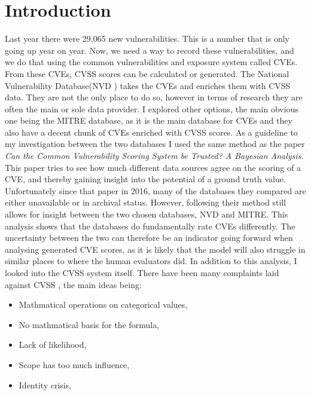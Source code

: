 \documentclass[12pt]{article}
\begin{document}
\section{Introduction}

Last year there were 29,065 new vulnerabilities. This is a number that is only going up year on
year. Now, we need a way to record these vulnerabilities, and we do that using the common
vulnerabilities and exposure system called CVEs. From these CVEs, CVSS scores can be calculated or
generated. The National Vulnerability Database(NVD \cite{NVD}) takes the CVEs and enriches them with
CVSS data. They are not the only place to do so, however in terms of research they are often the
main or sole data provider. \cite{costa} \cite{nvd_example1} \cite{nvd_example2} I explored other
options, the main obvious one being the MITRE \cite{MITRE} database, as it is the main database for
CVEs and they also have a decent chunk of CVEs enriched with CVSS scores. As a guideline to my
investigation between the two databases I used the same method as the paper \textit{Can the Common
	Vulnerability Scoring System be Trusted? A Bayesian Analysis}. \cite{bayes} This paper tries to see
how much different data sources agree on the scoring of a CVE, and thereby gaining insight into the
potential of a ground truth value. Unfortunately since that paper in 2016, many of the databases
they compared are either unavailable or in archival status. However, following their method still
allows for insight between the two chosen databases, NVD and MITRE. This analysis shows that the
databases do fundamentally rate CVEs differently. The uncertainty between the two can therefore be
an indicator going forward when analysing generated CVE scores, as it is likely that the model will
also struggle in similar places to where the human evaluators did. In addition to this analysis, I
looked into the CVSS system itself. There have been many complaints laid against
CVSS \cite{ubiquitous} \cite{improving_cvss} \cite{time_to_change_cvss}, the main ideas being:

\begin{itemize}
	\item Mathmatical operations on categorical values,
	\item No mathmatical basis for the formula,
	\item Lack of likelihood,
	\item Scope has too much influence,
	\item Identity crisis,
\end{itemize}
\end{document}
